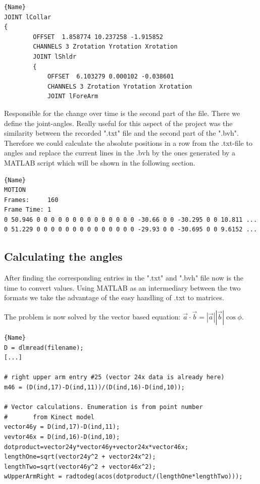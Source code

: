 \documentclass[a4paper]{article}
\begin{document}
\begin{lstlisting}[caption=.bvh Connected Structure. The connection is a tree-structure. Changes in parents will affect positions of children parts without(!) changing their angle values.]{Name}
JOINT lCollar
{
		OFFSET	1.858774 10.237258 -1.915852
		CHANNELS 3 Zrotation Yrotation Xrotation
		JOINT lShldr
		{
			OFFSET	6.103279 0.000102 -0.038601
			CHANNELS 3 Zrotation Yrotation Xrotation
			JOINT lForeArm
\end{lstlisting}

Responsible for the change over time is the second part of the file.
There we define the joint-angles.
Really useful for this aspect of the project was the similarity between the recorded ".txt" file and the second part of the ".bvh".
Therefore we could calculate the absolute positions in a row from the .txt-file to angles and replace the current lines in the .bvh by the ones generated by a MATLAB script which will be shown in the following section.

\begin{lstlisting}[caption=Motionpart of .bvh. It's including the information about the number of total frames aswell as the time per frame and a line containing angle values for each frame.]{Name}
MOTION
Frames:     160
Frame Time: 1                
0 50.946 0 0 0 0 0 0 0 0 0 0 0 0 0 0 -30.66 0 0 -30.295 0 0 10.811 ...
0 51.229 0 0 0 0 0 0 0 0 0 0 0 0 0 0 -29.93 0 0 -30.695 0 0 9.6152 ...
\end{lstlisting}

\subsection{Calculating the angles}

After finding the corresponding entries in the ".txt" and ".bvh" file now is the time to convert values.
Using MATLAB as an intermediary between the two formats we take the advantage of the easy handling of .txt to matrices.

The problem is now solved by the vector based equation: $\vec a \cdot \vec b = \left|\vec a \right| \left|\vec b \right| \cos \phi$.

\begin{lstlisting}[caption=Calculating the angle. Each calculation requires two vectors which need to be extracted from the absolute kinect point. After calculating the lenght of them both we can insert these values into the formula and receive the angle needed.]{Name}
D = dlmread(filename);
[...]

# right upper arm entry #25 (vector 24x data is already here)
m46 = (D(ind,17)-D(ind,11))/(D(ind,16)-D(ind,10));

# Vector calculations. Enumeration is from point number
#       from Kinect model
vector46y = D(ind,17)-D(ind,11);
vevtor46x = D(ind,16)-D(ind,10);
dotproduct=vector24y*vector46y+vector24x*vector46x;
lengthOne=sqrt(vector24y^2 + vector24x^2);
lengthTwo=sqrt(vector46y^2 + vector46x^2); 
wUpperArmRight = radtodeg(acos(dotproduct/(lengthOne*lengthTwo)));
\end{lstlisting}
\end{document}
